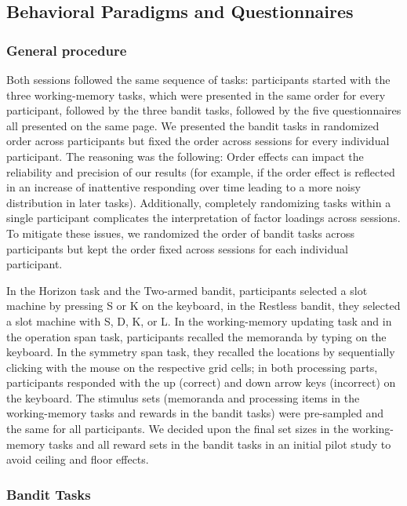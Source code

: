 \documentclass[fleqn,10pt]{wlscirep}
\begin{document}
\subsection*{Behavioral Paradigms and Questionnaires}

\subsubsection*{General procedure}

Both sessions followed the same sequence of tasks: participants started with the three working-memory tasks, which were presented in the same order for every participant, followed by the three bandit tasks, followed by the five questionnaires all presented on the same page. We presented the bandit tasks in randomized order across participants but fixed the order across sessions for every individual participant. The reasoning was the following: Order effects can impact the reliability and precision of our results\cite{goodhew2019translating} (for example, if the order effect is reflected in an increase of inattentive responding over time leading to a more noisy distribution in later tasks). Additionally, completely randomizing tasks within a single participant complicates the interpretation of factor loadings across sessions. To mitigate these issues, we randomized the order of bandit tasks across participants but kept the order fixed across sessions for each individual participant. 

In the Horizon task and the Two-armed bandit, participants selected a slot machine by pressing S or K on the keyboard, in the Restless bandit, they selected a slot machine with S, D, K, or L. In the working-memory updating task and in the operation span task, participants recalled the memoranda by typing on the keyboard. In the symmetry span task, they recalled the locations by sequentially clicking with the mouse on the respective grid cells; in both processing parts, participants responded with the up (correct) and down arrow keys (incorrect) on the keyboard. The stimulus sets (memoranda and processing items in the working-memory tasks and rewards in the bandit tasks) were pre-sampled and the same for all participants. We decided upon the final set sizes in the working-memory tasks and all reward sets in the bandit tasks in an initial pilot study to avoid ceiling and floor effects.

\subsubsection*{Bandit Tasks}
\end{document}
